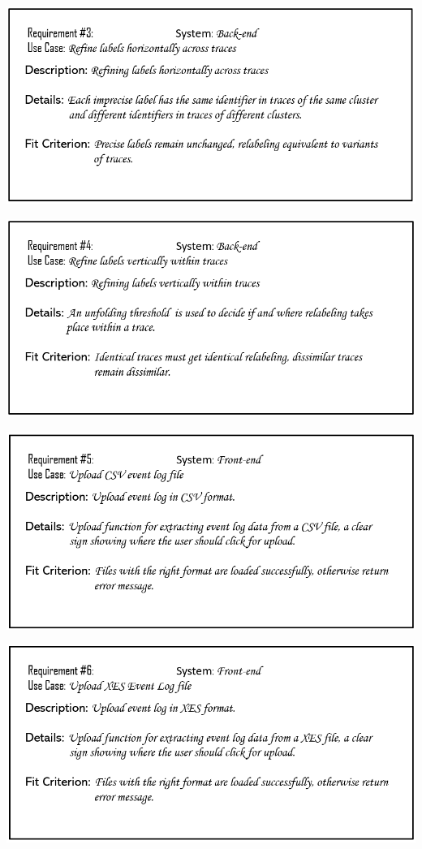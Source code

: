 \documentclass[notitlepage]{article}
\begin{document}
\begin{flushleft}
\includegraphics[scale=0.6]{reqq3.png}

\includegraphics[scale=0.6]{reqq4.png}

\includegraphics[scale=0.6]{reqq5.png}

\includegraphics[scale=0.6]{reqq6.png}


\end{flushleft}
\end{document}
